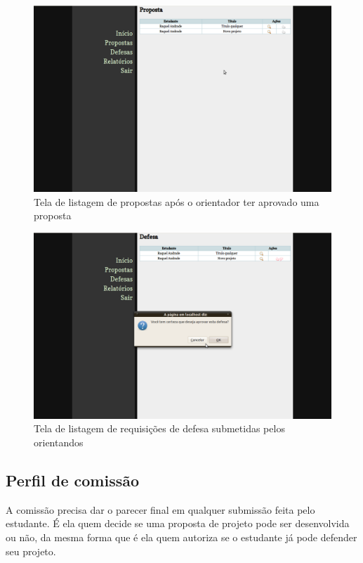 \begin{figure}[htbp]
\centering
\includegraphics[width=1\textwidth]{fig/telas/processo/professor_03_proposta_aprovada.png}
\caption{Tela de listagem de propostas após o orientador ter aprovado uma proposta}
\label{fig:professor_03_proposta_aprovada}
\end{figure}

\begin{figure}[htbp]
\centering
\includegraphics[width=1\textwidth]{fig/telas/processo/professor_04_avaliando_defesa.png}
\caption{Tela de listagem de requisições de defesa submetidas pelos orientandos}
\label{fig:professor_04_avaliando_defesa}
\end{figure}

\subsection{Perfil de comissão}
A comissão precisa dar o parecer final em qualquer submissão feita pelo estudante. É ela quem
decide se uma proposta de projeto pode ser desenvolvida ou não, da mesma forma que é ela quem
autoriza se o estudante já pode defender seu projeto.

